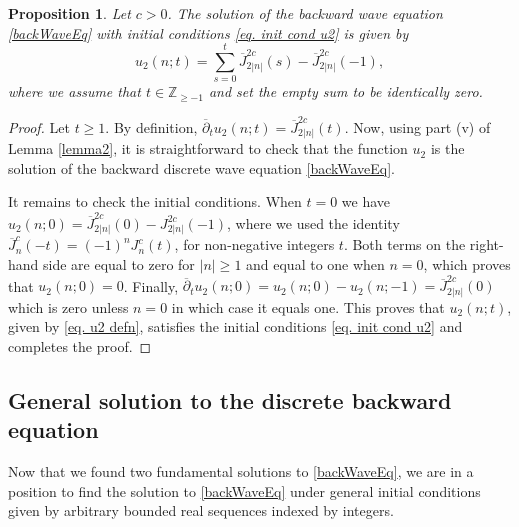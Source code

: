\documentclass[12pt]{amsart}
\numberwithin{equation}{section}
\newtheorem{proposition}[theorem]{Proposition}
\begin{document}
\begin{proposition}
Let $c>0$. The solution of the backward wave equation \eqref{backWaveEq}
with initial conditions \eqref{eq. init cond u2} is given by
\begin{equation}\label{eq. u2 defn}
u_{2}\left( n;t\right) =\sum_{s=0}^{t}\overline{J}_{2\left\vert n\right\vert
}^{2c}\left( s\right) - \overline{J}_{2\left\vert n\right\vert
}^{2c}\left( -1\right),
\end{equation}
where we assume that $t\in\mathbb{Z}_{\geq -1}$ and set the empty sum to be identically zero.
\end{proposition}
\begin{proof}
Let $t\geq 1$. By definition, $\overline{\partial}_t u_2(n;t) = \overline{J}_{2\left\vert n\right\vert
}^{2c}\left( t\right) $. Now, using part (v) of Lemma \ref{lemma2}, it is straightforward to check that  the function $u_{2}$ is the solution of the backward discrete wave equation \eqref{backWaveEq}.

It remains to check the initial conditions. When $t=0$ we have $u_2(n;0)= \overline{J}_{2\left\vert n\right\vert}^{2c}\left( 0\right) - J_{2\left\vert n\right\vert
}^{2c}\left( -1\right)$, where we used the identity $\overline{J}_n^c(-t)=(-1)^n J_n^c(t)$, for non-negative integers $t$. Both terms on the right-hand side are equal to zero for $|n|\geq 1$ and equal to one when $n=0$, which proves that $u_2(n;0)=0$. Finally, $\overline{\partial }_{t}u_2\left( n;0\right) = u_2(n;0) - u_2(n;-1)=\overline{J}_{2\left\vert n\right\vert}^{2c}\left( 0\right)$ which is zero unless $n=0$ in which case it equals one.
This proves that $u_2(n;t)$, given by \eqref{eq. u2 defn}, satisfies the initial conditions \eqref{eq. init cond u2} and completes the proof.
\end{proof}

\subsection{General solution to the discrete backward equation}

Now that we found two fundamental solutions to \eqref{backWaveEq}, we are in a position to find the solution to \eqref{backWaveEq} under general initial conditions given by arbitrary bounded real sequences indexed by integers.

\end{document}
